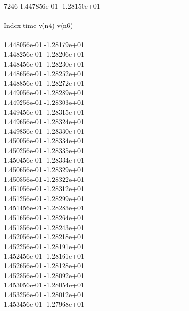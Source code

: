 7246	1.447856e-01	-1.28150e+01	\\ \hline
\\ \hline
Index   time            v(n4)-v(n6)     \\ \hline
--------------------------------------------------------------------------------\\ 	1.448056e-01	-1.28179e+01	\\ 	1.448256e-01	-1.28206e+01	\\ 	1.448456e-01	-1.28230e+01	\\ 	1.448656e-01	-1.28252e+01	\\ 	1.448856e-01	-1.28272e+01	\\ 	1.449056e-01	-1.28289e+01	\\ 	1.449256e-01	-1.28303e+01	\\ 	1.449456e-01	-1.28315e+01	\\ 	1.449656e-01	-1.28324e+01	\\ 	1.449856e-01	-1.28330e+01	\\ 	1.450056e-01	-1.28334e+01	\\ 	1.450256e-01	-1.28335e+01	\\ 	1.450456e-01	-1.28334e+01	\\ 	1.450656e-01	-1.28329e+01	\\ 	1.450856e-01	-1.28322e+01	\\ 	1.451056e-01	-1.28312e+01	\\ 	1.451256e-01	-1.28299e+01	\\ 	1.451456e-01	-1.28283e+01	\\ 	1.451656e-01	-1.28264e+01	\\ 	1.451856e-01	-1.28243e+01	\\ 	1.452056e-01	-1.28218e+01	\\ 	1.452256e-01	-1.28191e+01	\\ 	1.452456e-01	-1.28161e+01	\\ 	1.452656e-01	-1.28128e+01	\\ 	1.452856e-01	-1.28092e+01	\\ 	1.453056e-01	-1.28054e+01	\\ 	1.453256e-01	-1.28012e+01	\\ 	1.453456e-01	-1.27968e+01	\\ \hline
